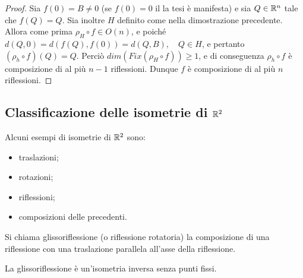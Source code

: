  \begin{proof}
 Sia $f(0)=B\ne 0$ (se $f(0)=0$ il la tesi è manifesta) e sia $Q\in \mathbb R^n$
 tale che $f(Q)=Q$. Sia inoltre $H$ definito come nella dimostrazione precedente.
 Allora come prima $\rho_H\circ f\in O(n)$, e poiché $d(Q,0)=d(f(Q),f(0))=d(Q,B),\quad Q\in H$, e pertanto
 $(\rho_h\circ f)(Q)=Q$.
 Perciò $dim(Fix(\rho_H\circ f))\ge 1$, e di conseguenza $\rho_h\circ f$ è composizione di al più
 $n-1$
 riflessioni.
 Dunque $f$ è composizione di al più $n$ riflessioni.
  \end{proof}

	\subsection{Classificazione delle isometrie di $\mathbb R^2$}
 
 Alcuni esempi di isometrie di $\mathbb R^2$ sono:
 \begin{itemize}
	\item traslazioni;
	\item rotazioni;
	\item riflessioni;
	\item composizioni delle precedenti.
 \end{itemize}
 
 \begin{definition}
 Si chiama glissoriflessione (o riflessione rotatoria) la composizione di una riflessione con una traslazione parallela
 all'asse della riflessione.
 \end{definition}
 
 \begin{remark}
 La glissoriflessione è un'isometria inversa senza punti fissi.
 \end{remark}
 
